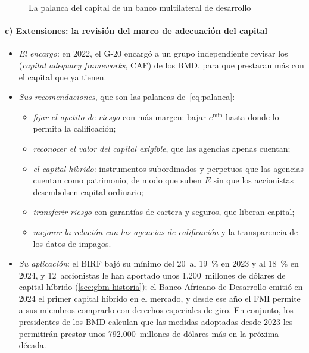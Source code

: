 \documentclass[11pt]{article}
\begin{document}
\begin{figure}[H]
\centering
\caption{La palanca del capital de un banco multilateral de desarrollo}\label{fig:palanca}
\end{figure}

\paragraph{c) Extensiones: la revisión del marco de adecuación del capital}

\begin{itemize}
\item \emph{El encargo}: en 2022, el G-20 encargó a un grupo independiente revisar los  (\emph{capital adequacy frameworks}, CAF) de los BMD, para que prestaran más con el capital que ya tienen\nocite{G202022CAF}.
\item \emph{Sus recomendaciones}, que son las palancas de~\eqref{eq:palanca}:
  \begin{itemize}
  \item \emph{fijar el apetito de riesgo} con más margen: bajar $e^{\min}$ hasta donde lo permita la calificación;
  \item \emph{reconocer el valor del capital exigible}, que las agencias apenas cuentan;
  \item \emph{el capital híbrido}: instrumentos subordinados y perpetuos que las agencias cuentan como patrimonio, de modo que suben $E$ sin que los accionistas desembolsen capital ordinario;
  \item \emph{transferir riesgo} con garantías de cartera y seguros, que liberan capital;
  \item \emph{mejorar la relación con las agencias de calificación} y la transparencia de los datos de impagos.
  \end{itemize}
\item \emph{Su aplicación}: el BIRF bajó su mínimo del 20~al 19~\% en 2023 y al 18~\% en 2024, y 12~accionistas le han aportado unos 1.200~millones de dólares de capital híbrido\nocite{BM2024Evolucion,BM2026InformeAnual} (\ref{sec:gbm-historia}); el Banco Africano de Desarrollo emitió en 2024 el primer capital híbrido en el mercado, y desde ese año el FMI permite a sus miembros comprarlo con derechos especiales de giro\nocite{BAfD2024Hibrido,FMI2024DEGHibrido}. En conjunto, los presidentes de los BMD calculan que las medidas adoptadas desde 2023 les permitirán prestar unos 792.000~millones de dólares más en la próxima década\nocite{BMD2026Declaracion}.
\end{itemize}
\end{document}
